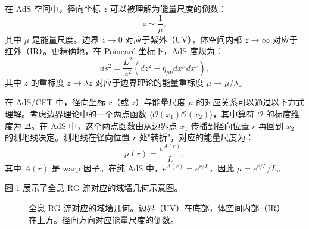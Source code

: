 \begin{definition}[全息 RG 流]\label{def:holographic_rg}
在 AdS 空间中，径向坐标 $z$ 可以被理解为能量尺度的倒数：
\begin{equation}
    z \sim \frac{1}{\mu},
\end{equation}
其中 $\mu$ 是能量尺度。边界 $z \to 0$ 对应于紫外（UV），体空间内部 $z \to \infty$ 对应于红外（IR）。更精确地，在 Poincar\'e 坐标下，AdS 度规为：
\begin{equation}
    ds^2 = \frac{L^2}{z^2}\left(dz^2 + \eta_{\mu\nu}dx^\mu dx^\nu\right),
\end{equation}
其中 $z$ 的重标度 $z \to \lambda z$ 对应于边界理论的能量重标度 $\mu \to \mu/\lambda$。
\end{definition}

\begin{proposition}[径向坐标与能量尺度的对应]\label{prop:radial-energy}
在 AdS/CFT 中，径向坐标 $r$（或 $z$）与能量尺度 $\mu$ 的对应关系可以通过以下方式理解。考虑边界理论中的一个两点函数 $\langle \mathcal{O}(x_1)\mathcal{O}(x_2)\rangle$，其中算符 $\mathcal{O}$ 的标度维度为 $\Delta$。在 AdS 中，这个两点函数由从边界点 $x_1$ 传播到径向位置 $r$ 再回到 $x_2$ 的测地线决定。测地线在径向位置 $r$ 处"转折"，对应的能量尺度为：
\begin{equation}
    \mu(r) = \frac{e^{A(r)}}{L},
\end{equation}
其中 $A(r)$ 是 warp 因子。在纯 AdS 中，$e^{A(r)} = e^{r/L}$，因此 $\mu = e^{r/L}/L$。
\end{proposition}

图 \ref{fig:domain_wall} 展示了全息 RG 流对应的域墙几何示意图。

\begin{figure}[htbp]
\centering
{}
\caption{全息 RG 流对应的域墙几何。边界（UV）在底部，体空间内部（IR）在上方。径向方向对应能量尺度的倒数。}
\label{fig:domain_wall}
\end{figure}


